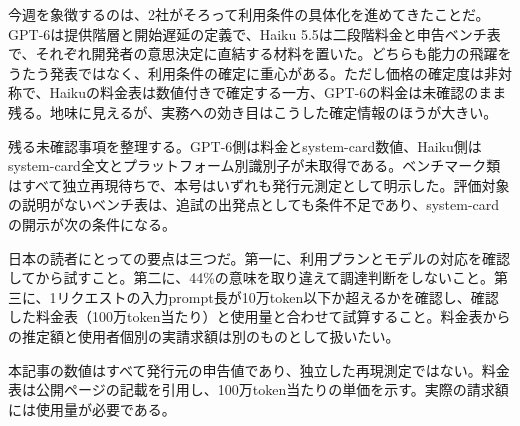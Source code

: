 今週を象徴するのは、2社がそろって利用条件の具体化を進めてきたことだ。GPT-6は提供階層と開始遅延の定義で、Haiku 5.5は二段階料金と申告ベンチ表で、それぞれ開発者の意思決定に直結する材料を置いた。どちらも能力の飛躍をうたう発表ではなく、利用条件の確定に重心がある。ただし価格の確定度は非対称で、Haikuの料金表は数値付きで確定する一方、GPT-6の料金は未確認のまま残る。地味に見えるが、実務への効き目はこうした確定情報のほうが大きい。\cite{gpt6ui}\cite{haiku55}

残る未確認事項を整理する。GPT-6側は料金とsystem-card数値、Haiku側はsystem-card全文とプラットフォーム別識別子が未取得である。ベンチマーク類はすべて独立再現待ちで、本号はいずれも発行元測定として明示した。評価対象の説明がないベンチ表は、追試の出発点としても条件不足であり、system-cardの開示が次の条件になる。\cite{gpt6ui}\cite{haiku55}

日本の読者にとっての要点は三つだ。第一に、利用プランとモデルの対応を確認してから試すこと。第二に、44\%の意味を取り違えて調達判断をしないこと。第三に、1リクエストの入力prompt長が10万token以下か超えるかを確認し、確認した料金表（100万token当たり）と使用量と合わせて試算すること。料金表からの推定額と使用者個別の実請求額は別のものとして扱いたい。\cite{gpt6ui}\cite{haiku55}

\begin{technicalnote}[Note]
本記事の数値はすべて発行元の申告値であり、独立した再現測定ではない。料金表は公開ページの記載を引用し、100万token当たりの単価を示す。実際の請求額には使用量が必要である。
\end{technicalnote}
